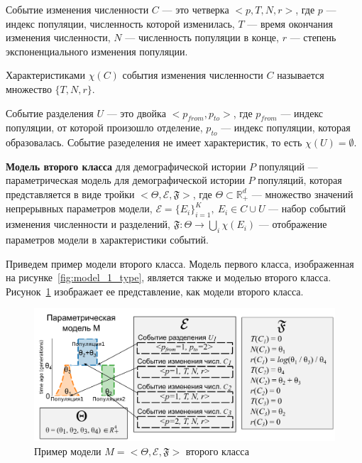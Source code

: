 \documentclass[a4paper,14pt,oneside,openany,article]{memoir}
\begin{document}

 Событие изменения численности $C$ --- это четверка $<p, T, N, r>$, где $p$ --- индекс популяции, численность которой изменилась, $T$ --- время окончания изменения численности, $N$ --- численность популяции в конце, $r$ --- степень экспоненциального изменения популяции.

 Характеристиками $\chi(C)$ события изменения численности $C$ называется множество $\{T, N, r\}$.

 Событие разделения $U$ --- это двойка $<p_{from}, p_{to}>$, где $p_{from}$ --- индекс популяции, от которой произошло отделение, $p_{to}$ --- индекс популяции, которая образовалась.
Событие разеделения не имеет характеристик, то есть $\chi(U) = \emptyset$.

\textbf{Модель второго класса} для демографической истории $P$ популяций --- параметрическая модель для демографической истории $P$ популяций, которая представляется в виде тройки $<\Theta, \mathcal{E}, \mathfrak{F}>$, где $\Theta \subset \mathbb{R}_+^d$ --- множество значений непрерывных параметров модели, $\mathcal{E} = \{E_i\}_{i=1}^K,\ E_i \in C \cup U$ --- набор событий изменения численности и разделений, $\mathfrak{F}: \Theta \to \bigcup_i \chi(E_i)$ --- отображение параметров модели в характеристики событий.

Приведем пример модели второго класса.
Модель первого класса, изображенная на рисунке~\ref{fig:model_1_type}, является также и моделью второго класса.
Рисунок~\ref{fig:model_2_type} изображает ее представление, как модели второго класса.

\begin{figure}[h]
    \centering
    \includegraphics[width=\textwidth]{images_2/model_2_type.pdf}
    \caption{Пример модели $M = <\Theta, \mathcal{E}, \mathfrak{F}>$ второго класса}
    \label{fig:model_2_type}
\end{figure}
\end{document}
